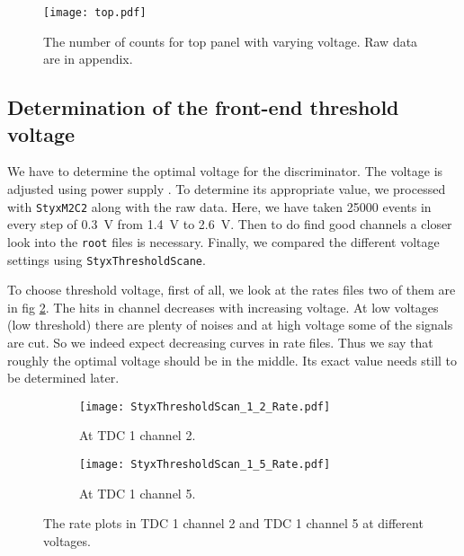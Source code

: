 \begin{figure}[H]
		\begin{center}
			\texttt{[image: top.pdf]}
		\end{center}
	\caption{The number of counts for top panel with varying voltage. Raw data are in appendix.}%
	\label{fig:PMTvoltageTop}
\end{figure}	
	
\subsection{Determination of the front-end threshold voltage}	
We have to determine the optimal voltage for the discriminator. The voltage is adjusted using power supply \cite{manual}. To determine its appropriate value, we processed with \verb|StyxM2C2| along with the raw data. Here, we have taken \num{25000} events in every step of \SI{0.3}{\volt} from \SI{1.4}{\volt} to \SI{2.6}{\volt}. Then to do find good channels a closer look into the \verb|root| files is necessary.  Finally, we compared the different voltage settings using \verb|StyxThresholdScane|.

To choose threshold voltage, first of all, we look at the rates files two of them are in fig \ref{fig:rate}. The hits in channel decreases with increasing voltage. At low voltages (low threshold) there are plenty of noises and at high voltage some of the signals are cut. So we indeed expect decreasing curves in rate files. Thus we say that roughly the optimal voltage should be in the middle. Its exact value needs still to be determined later.
\begin{figure}[H]
	\centering
	\begin{subfigure}[t]{0.8\textwidth}
		\begin{center}
\texttt{[image: StyxThresholdScan\_1\_2\_Rate.pdf]}
		\end{center}
		\caption{At TDC 1 channel 2.}
	\end{subfigure}
	
	\begin{subfigure}[t]{0.8\textwidth}
		\begin{center}
	\texttt{[image: StyxThresholdScan\_1\_5\_Rate.pdf]}
		\end{center}
		\caption{At TDC 1 channel 5.}
	\end{subfigure}
	\caption{The rate plots in TDC 1 channel 2 and TDC 1 channel 5 at different voltages.}%
	\label{fig:rate}
\end{figure}

